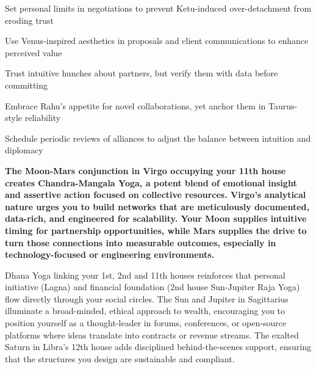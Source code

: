 \begin{diamondlist}
  \item {\fontsize{8.5}{12}\selectfont Set personal limits in negotiations to prevent Ketu-induced over-detachment from eroding trust}
  \item {\fontsize{8.5}{12}\selectfont Use Venus-inspired aesthetics in proposals and client communications to enhance perceived value}
  \item {\fontsize{8.5}{12}\selectfont Trust intuitive hunches about partners, but verify them with data before committing}
  \item {\fontsize{8.5}{12}\selectfont Embrace Rahu's appetite for novel collaborations, yet anchor them in Taurus-style reliability}
  \item {\fontsize{8.5}{12}\selectfont Schedule periodic reviews of alliances to adjust the balance between intuition and diplomacy}
\end{diamondlist}


\label{topic20}

{\fontsize{9.5}{13.8}\selectfont\bfseries\color{DeepSlate} The Moon-Mars conjunction in Virgo occupying your 11th house creates Chandra-Mangala Yoga, a potent blend of emotional insight and assertive action focused on collective resources. Virgo's analytical nature urges you to build networks that are meticulously documented, data-rich, and engineered for scalability. Your Moon supplies intuitive timing for partnership opportunities, while Mars supplies the drive to turn those connections into measurable outcomes, especially in technology-focused or engineering environments.}\par\vspace{2mm}

{\fontsize{9}{13}\selectfont Dhana Yoga linking your 1st, 2nd and 11th houses reinforces that personal initiative (Lagna) and financial foundation (2nd house Sun-Jupiter Raja Yoga) flow directly through your social circles. The Sun and Jupiter in Sagittarius illuminate a broad-minded, ethical approach to wealth, encouraging you to position yourself as a thought-leader in forums, conferences, or open-source platforms where ideas translate into contracts or revenue streams. The exalted Saturn in Libra's 12th house adds disciplined behind-the-scenes support, ensuring that the structures you design are sustainable and compliant.}\par\vspace{1.8mm}

